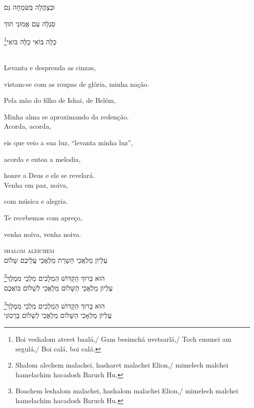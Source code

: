וּבְצָהֳלָה בְּשִּׂמְחָה גַּם 

סְגֻלָּה עַם אֱמוּנֵי תּוֹךְ 

\footnote{
Boi veshalom ateret baalá,/ Gam besimchá uvetsarlá,/
Toch emunei am segulá,/ Boi calá, boi calá.}כַלָּה בּוֹאִי כַלָּה בּוֹאִי

\movetooddpage
\raggedright

\vspace*{1cm}

\textsc{}\\[15pt]


Levanta e desprenda as cinzas,

vistam-se com as roupas de glória, minha nação.

Pela mão do filho de Ishai, de Belém,

Minha alma se aproximando da redenção.\\[10pt]

Acorda, acorda,

eis que veio a sua luz, ``levanta minha luz'',

acorda e entoa a melodia,

honre a Deus e ele se revelará.\\[10pt]

Venha em paz, noiva,

com música e alegria.

Te recebemos com apreço,

venha noiva, venha noiva.

\movetoevenpage
\raggedleft
{}

\vspace*{1cm}

\textsc{shalom aleichem}\\[15pt]

עֶלְיוֹן מַלְאֲכֵי הַשָרֵת מַלְאֲכֵי עֲלֵיכֶם שָלוֹם

\footnote{Shalom alechem malachei, hasharet malachei Elion,/
mimelech malchei hamelachim hacadosh Baruch Hu.}הוּא בָרוּךְ הַקָדוֹשׁ הַמְלָכִים מַלְכֵי מִמֶלֶךְ\\[10pt]

עֶלְיוֹן מַלְאֲכֵי הַשָּׁלוֹם מַלְאֲכֵי לְשָׁלוֹם בּוֹאֲכֶם

\footnote{Boachem leshalom malachei, hashalom malachei Elion,/
mimelech malchei hamelachim hacadosh Baruch Hu.}הוּא בָרוּךְ הַקָדוֹשׁ הַמְלָכִים מַלְכֵי מִמֶלֶךְ\\[10pt]

עֶלְיוֹן מַלְאָכִי הַשָּׁלוֹם מַלְאֲכֵי לְשָלוֹם בָרְכוּנִי

